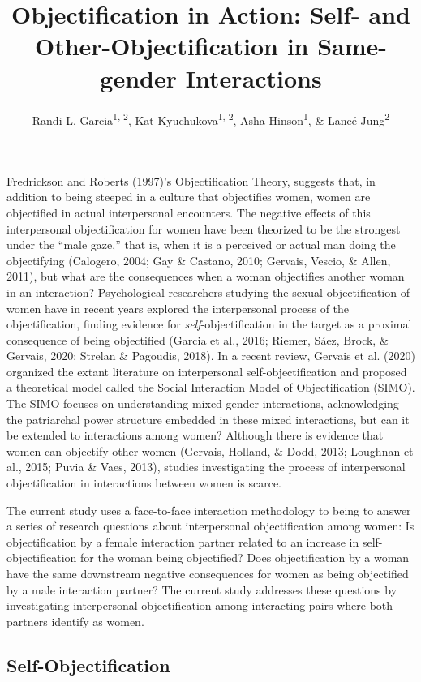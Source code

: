 \documentclass[man]{apa6}
\title{Objectification in Action: Self- and Other-Objectification in
Same-gender Interactions}
\author{Randi L. Garcia\textsuperscript{1, 2}, Kat
Kyuchukova\textsuperscript{1, 2}, Asha Hinson\textsuperscript{1}, \&
Laneé Jung\textsuperscript{2}}
\date{}
\affiliation{
\vspace{0.5cm}
\textsuperscript{1} Department of Psychology, Smith College\\\textsuperscript{2} Program in Statistical and Data Sciences, Smith College}
\begin{document}
\maketitle

Fredrickson and Roberts (1997)'s Objectification Theory, suggests that,
in addition to being steeped in a culture that objectifies women, women
are objectified in actual interpersonal encounters. The negative effects
of this interpersonal objectification for women have been theorized to
be the strongest under the \enquote{male gaze,} that is, when it is a
perceived or actual man doing the objectifying (Calogero, 2004; Gay \&
Castano, 2010; Gervais, Vescio, \& Allen, 2011), but what are the
consequences when a woman objectifies another woman in an interaction?
Psychological researchers studying the sexual objectification of women
have in recent years explored the interpersonal process of the
objectification, finding evidence for \emph{self}-objectification in the
target as a proximal consequence of being objectified (Garcia et al.,
2016; Riemer, Sáez, Brock, \& Gervais, 2020; Strelan \& Pagoudis, 2018).
In a recent review, Gervais et al. (2020) organized the extant
literature on interpersonal self-objectification and proposed a
theoretical model called the Social Interaction Model of Objectification
(SIMO). The SIMO focuses on understanding mixed-gender interactions,
acknowledging the patriarchal power structure embedded in these mixed
interactions, but can it be extended to interactions among women?
Although there is evidence that women can objectify other women
(Gervais, Holland, \& Dodd, 2013; Loughnan et al., 2015; Puvia \& Vaes,
2013), studies investigating the process of interpersonal
objectification in interactions between women is scarce.

The current study uses a face-to-face interaction methodology to being
to answer a series of research questions about interpersonal
objectification among women: Is objectification by a female interaction
partner related to an increase in self-objectification for the woman
being objectified? Does objectification by a woman have the same
downstream negative consequences for women as being objectified by a
male interaction partner? The current study addresses these questions by
investigating interpersonal objectification among interacting pairs
where both partners identify as women.

\subsection{Self-Objectification}\label{self-objectification}
\end{document}
